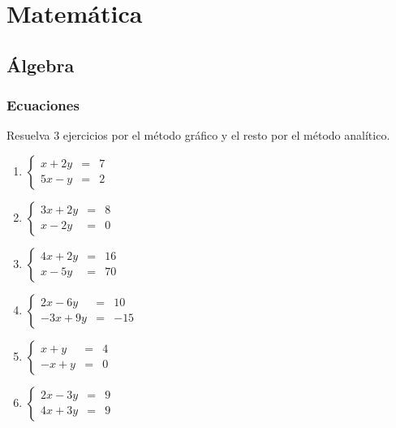 \section{Matemática}
\subsection{Álgebra}
\subsubsection{Ecuaciones}
Resuelva $3$ ejercicios por el método gráfico y el resto por el método analítico.
\begin{enumerate}
	\item $
			\left\{
			\begin{array}{rcl}
				x+2y & = & 7 \\
				5x-y & = & 2
			\end{array}
			\right.
		$
		\item $
			\left\{
			\begin{array}{rcl}
				3x+2y & = & 8 \\
				x-2y & = & 0
			\end{array}
			\right.
		$
		\item $
			\left\{
			\begin{array}{rcl}
				4x+2y & = & 16 \\
				x-5y & = & 70
			\end{array}
			\right.
		$
		\item $
			\left\{
			\begin{array}{rcl}
				2x-6y & = & 10 \\
				-3x+9y & = & -15
			\end{array}
			\right.
		$
		\item $
			\left\{
			\begin{array}{rcl}
				x+y & = & 4 \\
				-x+y & = & 0
			\end{array}
			\right.
		$
		\item $
			\left\{
			\begin{array}{rcl}
				2x-3y & = & 9 \\
				4x+3y & = & 9
			\end{array}
			\right.
		$
\end{enumerate}

